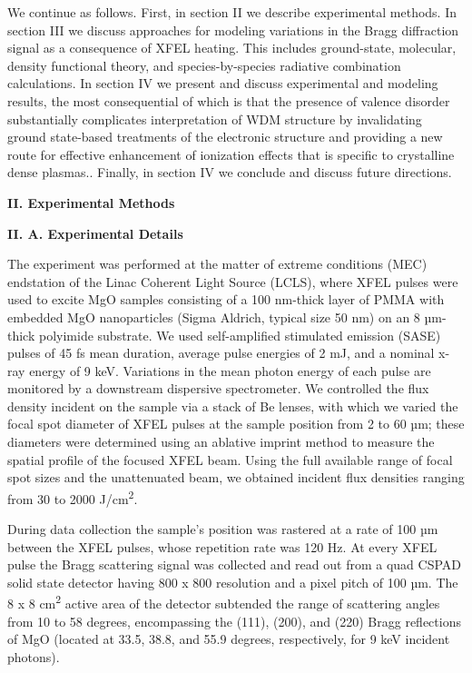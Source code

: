 We continue as follows. First, in section II we describe experimental
methods. In section III we discuss approaches for modeling variations in
the Bragg diffraction signal as a consequence of XFEL heating. This
includes ground-state, molecular, density functional theory, and
species-by-species radiative combination calculations. In section IV we
present and discuss experimental and modeling results, the most
consequential of which is that the presence of valence disorder
substantially complicates interpretation of WDM structure by
invalidating ground state-based treatments of the electronic structure
and providing a new route for effective enhancement of ionization
effects that is specific to crystalline dense plasmas.. Finally, in
section IV we conclude and discuss future directions.

\textbf{II. Experimental Methods}

\textbf{II. A. Experimental Details}

The experiment was performed at the matter of extreme conditions (MEC)
endstation of the Linac Coherent Light Source (LCLS), where XFEL pulses
were used to excite MgO samples consisting of a 100 nm-thick layer of
PMMA with embedded MgO nanoparticles (Sigma Aldrich, typical size 50 nm)
on an 8 µm-thick polyimide substrate. We used self-amplified stimulated
emission (SASE) pulses of 45 fs mean duration, average pulse energies of
2 mJ, and a nominal x-ray energy of 9 keV. Variations in the mean photon
energy of each pulse are monitored by a downstream dispersive
spectrometer. We controlled the flux density incident on the sample via
a stack of Be lenses, with which we varied the focal spot diameter of
XFEL pulses at the sample position from 2 to 60 µm; these diameters were
determined using an ablative imprint method to measure the spatial
profile of the focused XFEL beam.  Using the full available
range of focal spot sizes and the unattenuated beam, we obtained
incident flux densities ranging from 30 to 2000 J/cm\textsuperscript{2}.

During data collection the sample's position was rastered at a rate of
100 µm between the XFEL pulses, whose repetition rate was 120 Hz. At
every XFEL pulse the Bragg scattering signal was collected and read out
from a quad CSPAD solid state detector having 800 x 800 resolution and a
pixel pitch of 100 µm. \cite{HART2012CSPAD} The 8 x 8 cm\textsuperscript{2}
active area of the detector subtended the range of scattering angles
from 10 to 58 degrees, encompassing the (111), (200), and (220) Bragg
reflections of MgO (located at 33.5, 38.8, and 55.9 degrees,
respectively, for 9 keV incident photons).

